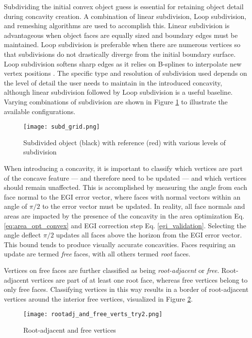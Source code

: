 Subdividing the initial convex object guess is essential for retaining object detail during concavity creation. A combination of linear subdivision, Loop subdivision, and remeshing algorithms are used to accomplish this. Linear subdivision is advantageous when object faces are equally sized and boundary edges must be maintained. Loop subdivision is preferable when there are numerous vertices so that subdivisions do not drastically diverge from the initial boundary surface. Loop subdivision softens sharp edges as it relies on B-splines to interpolate new vertex positions \cite{loop1987}. The specific type and resolution of subdivision used depends on the level of detail the user needs to maintain in the introduced concavity, although linear subdivision followed by Loop subdivision is a useful baseline. Varying combinations of subdivision are shown in Figure \ref{fig:subd_grid} to illustrate the available configurations.

\begin{figure}[!htb]
  \centering
  \texttt{[image: subd\_grid.png]}
  \caption{Subdivided object (black) with reference (red) with various levels of subdivision}
  \label{fig:subd_grid}
\end{figure}

When introducing a concavity, it is important to classify which vertices are part of the concave feature --- and therefore need to be updated --- and which vertices should remain unaffected. This is accomplished by measuring the angle from each face normal to the EGI error vector, where faces with normal vectors within an angle of $\pi/2$ to the error vector must be updated. In reality, all face normals and areas are impacted by the presence of the concavity in the area optimization Eq. \ref{eq:area_opt_convex} and EGI correction step Eq. \ref{egi_validation}. Selecting the angle deflect $\pi/2$ updates all faces above the horizon from the EGI error vector. This bound tends to produce visually accurate concavities. Faces requiring an update are termed \textit{free} faces, with all others termed \textit{root} faces.

Vertices on free faces are further classified as being \textit{root-adjacent} or \textit{free}. Root-adjacent vertices are part of at least one root face, whereas free vertices belong to only free faces. Classifying vertices in this way results in a border of root-adjacent vertices around the interior free vertices, visualized in Figure \ref{fig:root_and_free}.

\begin{figure}[!htb]
  \centering
  \texttt{[image: rootadj\_and\_free\_verts\_try2.png]}
  \caption{Root-adjacent and free vertices}
  \label{fig:root_and_free}
\end{figure}

